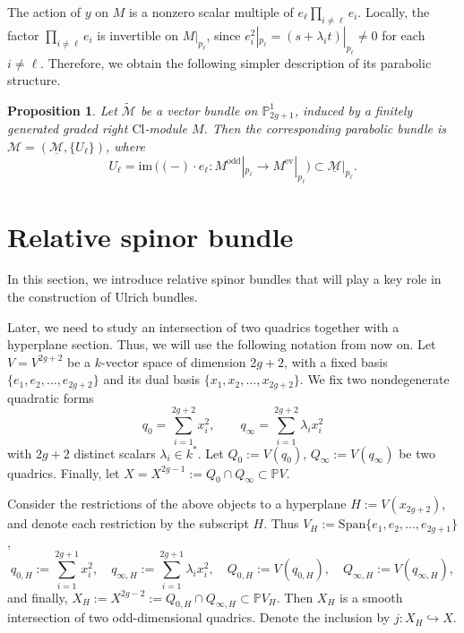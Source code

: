 \documentclass[12pt, letterpaper]{amsart}
\newtheorem{proposition}[theorem]{Proposition}
\theoremstyle{definition}
\newcommand{\PP}{\mathbb{P} }
\newcommand{\cM}{\mathcal{M} }
\newcommand{\hX}{{X_H} }
\newcommand{\lbd}{\lambda}
\def\im{\mathrm{im}\, }
\def\Cl{\mathrm{Cl}}
\begin{document}
The action of \(y\) on \(M\) is a nonzero scalar multiple of \(e_\ell\prod_{i\ne\ell}e_i\). Locally, the factor \(\prod_{i\ne\ell}e_i\) is invertible on \(M|_{p_\ell}\), since \(e_i^2|_{p_\ell}=(s+\lbd_i t)|_{p_\ell}\neq 0\) for each \(i\ne\ell\). Therefore, we obtain the following simpler description of its parabolic structure.

\begin{proposition}\label{prop:Cliffordmodule}
Let \(\widetilde{\cM}\) be a vector bundle on \(\PP_{2g+1}^1\), induced by a finitely generated graded right \(\Cl\)-module \(M\). Then the corresponding parabolic bundle is \(\cM = (\underline{\cM}, \{U_\ell\})\), where
\[U_\ell=\im\bigl((-) \cdot e_\ell :M^{\mathrm{odd}}|_{p_\ell}\to M^{\mathrm{ev}}|_{p_\ell}\bigr)\subset \underline{\cM}|_{p_\ell}.\]
\end{proposition}

\section{Relative spinor bundle}\label{sec:spinorbundle}

In this section, we introduce relative spinor bundles that will play a key role in the construction of Ulrich bundles.

Later, we need to study an intersection of two quadrics together with a hyperplane section. Thus, we will use the following notation from now on. Let \(V = V^{2g+2}\) be a \(k\)-vector space of dimension \(2g+2\), with a fixed basis \(\{e_1, e_2, \dots, e_{2g+2}\}\) and its dual basis \(\{x_1, x_2, \dots, x_{2g+2}\}\). We fix two nondegenerate quadratic forms
\begin{equation}\label{eqn:quadraticodd}
q_0 = \sum_{i=1}^{2g+2}x_i^2, \qquad q_\infty = \sum_{i=1}^{2g+2}\lambda_i x_i^2
\end{equation}
with \(2g+2\) distinct scalars \(\lambda_i \in k^*\). Let \(Q_0 := V(q_0)\), \(Q_\infty := V(q_\infty)\) be two quadrics. Finally, let \(X = X^{2g-1} := Q_0 \cap Q_\infty \subset \PP V\).

Consider the restrictions of the above objects to a hyperplane \(H := V(x_{2g+2})\), and denote each restriction by the subscript \(H\). Thus \(V_H := \mathrm{Span}\{e_1, e_2, \dots, e_{2g+1}\}\),
\[q_{0,H}:= \sum_{i=1}^{2g+1}x_i^2, \quad q_{\infty,H}:= \sum_{i=1}^{2g+1}\lambda_i x_i^2, \quad Q_{0,H} := V(q_{0,H}), \quad Q_{\infty,H} := V(q_{\infty,H}),\]
and finally, \(X_H := X^{2g-2}:=Q_{0, H} \cap Q_{\infty, H} \subset\PP V_H\). Then \(\hX\) is a smooth intersection of two odd-dimensional quadrics. Denote the inclusion by \(j : X_H \hookrightarrow X\).
\end{document}

